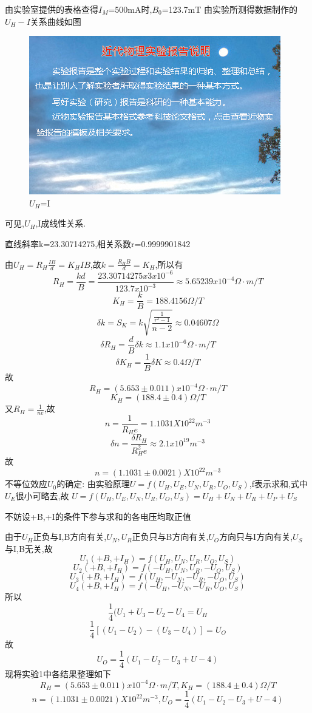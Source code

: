 \documentclass{thuemp}
\begin{document}
由实验室提供的表格查得$I_{M}$=500mA时,$B_{0}$=123.7mT
由实验所测得数据制作的$U_{H}-I$关系曲线如图
\begin{figure}[H]
	\centering
	\includegraphics[width=0.8\linewidth]{./image/example.jpg}
	\caption{$U_{H}$=I} \label{fig:eg}
\end{figure}
可见,$U_{H}$,I成线性关系.

直线斜率k=23.30714275,相关系数r=0.9999901842

由$U_{H}=R_{H}\frac{IB}{d}=K_{H}IB$,故$k=\frac{R_{H}B}{d}=K_{H}$,所以有
\[R_{H}=\frac{kd}{B}=\frac{23.30714275x3x10^{-6}}{123.7x10^{-3}}\approx5.65239x10^{-4} \Omega·m/T\]
\[K_{H}=\frac{k}{B}=188.4156 \Omega/T\]
\[\delta k =S_{K}=k\sqrt{\frac{\frac{1}{r^{2}-1}}{n-2}}\approx0.04607\Omega\]
\[\delta R_{H} = \frac{d}{B}\delta k \approx 1.1x10^{-6} \Omega·m/T\]
\[\delta K_{H} = \frac{1}{B}\delta K \approx 0.4\Omega/T\]
故\[R_{H}=(5.653\pm0.011)x10^{-4} \Omega ·m/T\]
\[K_{H}=(188.4\pm 0.4 )\Omega /T\]
又$R_{H}=\frac{1}{ne}$,故\[n=\frac{1}{R_{H}e}=1.1031X10^{22}m^{-3}\]
\[\delta n =\frac{\delta R_{H}}{R_{H}^{2}e}\approx2.1x10^{19}m^{-3}\]
故\[n=(1.1031\pm0.0021)X10^{22}m^{-3}\]
不等位效应$U_{0}$的确定:
由实验原理$U=f(U_{H},U_{E},U_{N},U_{R},U_{O},U_{S})$,f表示求和,式中$U_{E}$很小可略去,故
$U=f(U_{H},U_{E},U_{N},U_{R},U_{O},U_{S})=U_{H}+U_{N}+U_{R}+U_{P}+U_{S}$

不妨设+B,+I的条件下参与求和的各电压均取正值

由于$U_{H}$正负与I,B方向有关,$U_{N},U_{R}$正负只与B方向有关,$U_{O}$方向只与I方向有关,$U_{S}$与I,B无关,故
\[U_{1}(+B,+I_{H})=f(U_{H},U_{N},U_{R},U_{O},U_{S})\]
\[U_{2}(+B,+I_{H})=f(-U_{H},U_{N},U_{R},-U_{O},U_{S})\]
\[U_{3}(+B,+I_{H})=f(U_{H},-U_{N},-U_{R},-U_{O},U_{S})\]
\[U_{4}(+B,+I_{H})=f(-U_{H},-U_{N},-U_{R},U_{O},U_{S})\]
所以
\[\frac{1}{4}(U_{1}+U_{3}-U_{2}-U_{4}=U_{H}\]
\[\frac{1}{4}[(U_{1}-U_{2})-(U_{3}-U_{4})]=U_{O}\]
故\[U_{O}=\frac{1}{4}(U_{1}-U_{2}-U_{3}+U-{4})\]
现将实验1中各结果整理如下
\[R_{H}=(5.653\pm0.011)x10^{-4} \Omega ·m/T,K_{H}=(188.4\pm 0.4 )\Omega /T\]
\[n=(1.1031\pm0.0021)X10^{22}m^{-3},U_{O}=\frac{1}{4}(U_{1}-U_{2}-U_{3}+U-{4})\]
\end{document}
